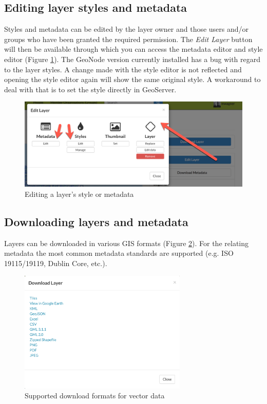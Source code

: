 \documentclass[a4paper,12pt,titlepage]{article}
\begin{document}
\subsection{Editing layer styles and metadata}

Styles and metadata can be edited by the layer owner and those users and/or groups who have been granted the required permission.
The \textit{Edit Layer} button will then be available through which you can access the metadata editor and style editor (Figure \ref{fig:edit_layer}). The GeoNode version currently installed has a bug with regard to the layer styles. A change made with the style editor is not reflected and opening the style editor again will show the same original style. A workaround to deal with that is to set the style directly in GeoServer.

\begin{figure}[H]
	\centering
	\includegraphics[width=12cm]{Images/edit_layer.png}
	\caption{Editing a layer's style or metadata}\label{fig:edit_layer}
\end{figure}

\subsection{Downloading layers and metadata}

Layers can be downloaded in various GIS formats (Figure \ref{fig:supported_formats}). For the relating metadata the most common metadata standards are supported (e.g. ISO 19115/19119, Dublin Core, etc.). 

\begin{figure}[H]
	\centering
	\includegraphics[width=8cm]{Images/supported_formats.png}
	\caption{Supported download formats for vector data}\label{fig:supported_formats}
\end{figure}
\end{document}
